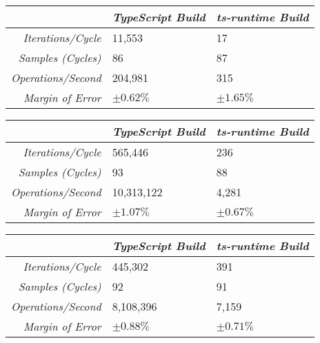 \begin{center}
{
\centering
\tabulinesep=1.2mm
\setlength{\tabcolsep}{5mm}
\def\arraystretch{1.25}
\small
\begin{tabu} to \textwidth {|r||X[c,m]|X[c,m]|}
  \hline
  & \emph{TypeScript Build} & \emph{ts-runtime Build} \\
  \hline
  \hline
  \emph{Iterations/Cycle}  & 11,553 & 17 \\
  \hline
  \emph{Samples (Cycles)}  & 86 & 87 \\
  \hline
  \emph{Operations/Second} & 204,981 & 315 \\
  \hline
  \emph{Margin of Error}   & $\pm 0.62\%$ & $\pm 1.65\%$ \\
  \hline
\end{tabu}
}
\end{center}

\begin{center}
{
\centering
\tabulinesep=1.2mm
\setlength{\tabcolsep}{5mm}
\def\arraystretch{1.25}
\small
\begin{tabu} to \textwidth {|r||X[c,m]|X[c,m]|}
  \hline
  & \emph{TypeScript Build} & \emph{ts-runtime Build} \\
  \hline
  \hline
  \emph{Iterations/Cycle}  & 565,446 & 236 \\
  \hline
  \emph{Samples (Cycles)}  & 93 & 88 \\
  \hline
  \emph{Operations/Second} & 10,313,122 & 4,281 \\
  \hline
  \emph{Margin of Error}   & $\pm 1.07\%$ & $\pm 0.67\%$ \\
  \hline
\end{tabu}
}
\end{center}

\begin{center}
{
\centering
\tabulinesep=1.2mm
\setlength{\tabcolsep}{5mm}
\def\arraystretch{1.25}
\small
\begin{tabu} to \textwidth {|r||X[c,m]|X[c,m]|}
  \hline
  & \emph{TypeScript Build} & \emph{ts-runtime Build} \\
  \hline
  \hline
  \emph{Iterations/Cycle}  & 445,302 & 391 \\
  \hline
  \emph{Samples (Cycles)}  & 92 & 91 \\
  \hline
  \emph{Operations/Second} & 8,108,396 & 7,159 \\
  \hline
  \emph{Margin of Error}   & $\pm 0.88\%$ & $\pm 0.71\%$ \\
  \hline
\end{tabu}
}
\end{center}

